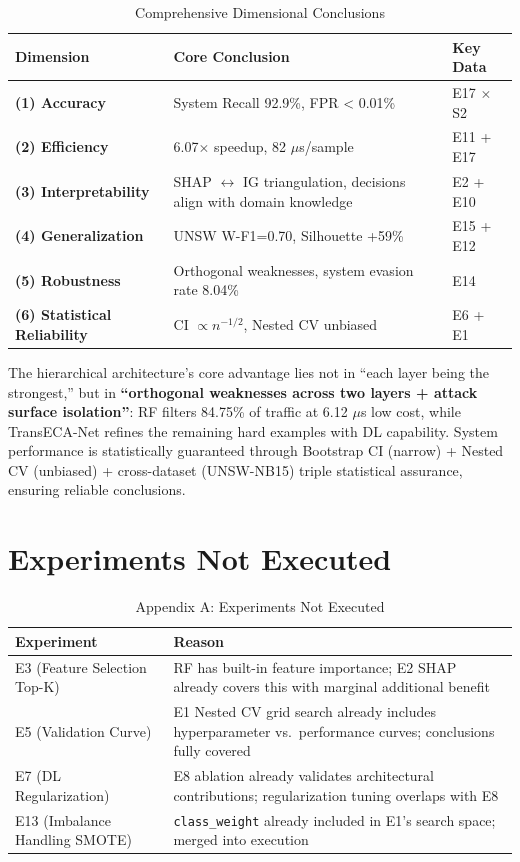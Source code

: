\documentclass[sigconf]{acmart}
\begin{document}
\begin{table}[H]
\caption{Comprehensive Dimensional Conclusions}
\label{tab:dimensional_conclusions}
\begin{tabular}{lll}
\toprule
\textbf{Dimension} & \textbf{Core Conclusion} & \textbf{Key Data} \\
\midrule
\textbf{(1) Accuracy} & System Recall 92.9\%, FPR < 0.01\% & E17 $\times$ S2 \\
\textbf{(2) Efficiency} & 6.07$\times$ speedup, 82 $\mu$s/sample & E11 + E17 \\
\textbf{(3) Interpretability} & SHAP $\leftrightarrow$ IG triangulation, decisions align with domain knowledge & E2 + E10 \\
\textbf{(4) Generalization} & UNSW W-F1=0.70, Silhouette +59\% & E15 + E12 \\
\textbf{(5) Robustness} & Orthogonal weaknesses, system evasion rate 8.04\% & E14 \\
\textbf{(6) Statistical Reliability} & CI $\propto n^{-1/2}$, Nested CV unbiased & E6 + E1 \\
\bottomrule
\end{tabular}
\end{table}

The hierarchical architecture's core advantage lies not in ``each layer being the strongest,'' but in \textbf{``orthogonal weaknesses across two layers + attack surface isolation''}: RF filters 84.75\% of traffic at 6.12 $\mu$s low cost, while TransECA-Net refines the remaining hard examples with DL capability. System performance is statistically guaranteed through Bootstrap CI (narrow) + Nested CV (unbiased) + cross-dataset (UNSW-NB15) triple statistical assurance, ensuring reliable conclusions.

\appendix

\section{Experiments Not Executed}

\begin{table}[H]
\caption{Appendix A: Experiments Not Executed}
\label{tab:not_executed}
\begin{tabular}{ll}
\toprule
\textbf{Experiment} & \textbf{Reason} \\
\midrule
E3 (Feature Selection Top-K) & RF has built-in feature importance; E2 SHAP already covers this with marginal additional benefit \\
E5 (Validation Curve) & E1 Nested CV grid search already includes hyperparameter vs.\ performance curves; conclusions fully covered \\
E7 (DL Regularization) & E8 ablation already validates architectural contributions; regularization tuning overlaps with E8 \\
E13 (Imbalance Handling SMOTE) & \texttt{class\_weight} already included in E1's search space; merged into execution \\
\bottomrule
\end{tabular}
\end{table}
\end{document}
